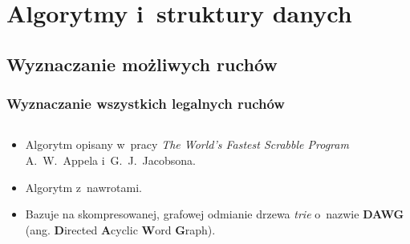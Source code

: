 \documentclass[10pt,a4paper]{beamer}
\begin{document}
\section{Algorytmy i~struktury danych}
\subsection{Wyznaczanie możliwych ruchów}

\begin{frame}
	\frametitle{Wyznaczanie wszystkich legalnych ruchów}
	
	\begin{columns}
		\begin{column}{.5\textwidth}
		
			\begin{itemize}
				\item Algorytm opisany w~pracy \emph{The World's Fastest Scrabble Program} A.~W.~Appela i~G.~J.~Jacobsona.
				\item Algorytm z~nawrotami.
				\item Bazuje na skompresowanej, grafowej odmianie drzewa \emph{trie} o~nazwie \textbf{DAWG} (ang. \textbf{D}irected \textbf{A}cyclic \textbf{W}ord \textbf{G}raph).
			\end{itemize}
			
		\end{column}
		

\end{columns}
\end{frame}
\end{document}
